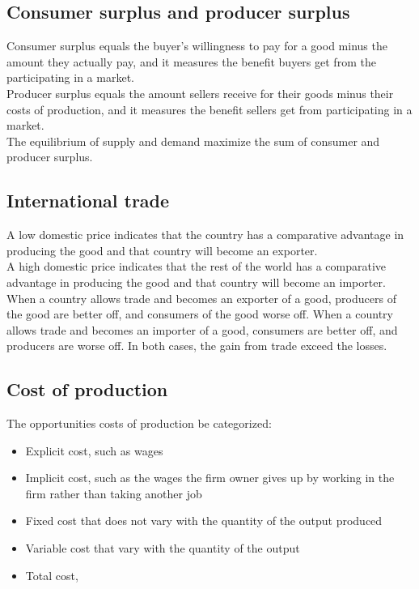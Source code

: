 \documentclass[a4paper,13pt]{report}
\begin{document}
\subsection{Consumer surplus and producer surplus}
Consumer surplus equals the buyer's willingness to pay for a good minus the amount they actually pay, and it measures the benefit buyers get from the participating in a market. \\
Producer surplus equals the amount sellers receive for their goods minus their costs of production, and it measures the benefit sellers get from participating in a market. \\
The equilibrium of supply and demand maximize the sum of consumer and producer surplus. 

\subsection{International trade}
A low domestic price indicates that the country has a comparative advantage in producing the good and that country will become an exporter. \\
A high domestic price indicates that the rest of the world has a comparative advantage in producing the good and that country will become an importer. \\
When a country allows trade and becomes an exporter of a good, producers of the good are better off, and consumers of the good worse off. When a country allows trade and becomes an importer of a good, consumers are better off, and producers are worse off. In both cases, the gain from trade exceed the losses. 


\subsection{Cost of production}
The opportunities costs of production be categorized:
\begin{itemize}
    \item Explicit cost, such as wages
    \item Implicit cost, such as the wages the firm owner gives up by working in the firm rather than taking another job
    \item Fixed cost that does not vary with the quantity of the output produced
    \item Variable cost that vary with the quantity of the output
    \item Total cost, 
\end{itemize}
\end{document}
